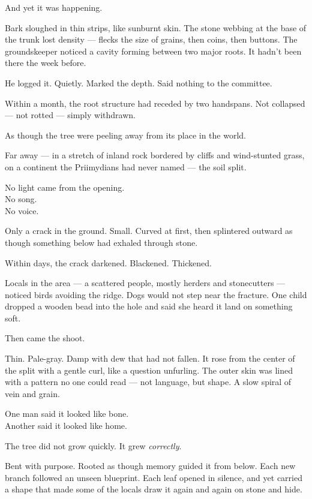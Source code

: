 \documentclass[9pt]{article}
\begin{document}
And yet it was happening.

Bark sloughed in thin strips, like sunburnt skin. The stone webbing at the base of the trunk lost density --- flecks the size of grains, then coins, then buttons. The groundskeeper noticed a cavity forming between two major roots. It hadn’t been there the week before.

He logged it. Quietly. Marked the depth. Said nothing to the committee.

Within a month, the root structure had receded by two handspans. Not collapsed --- not rotted --- simply withdrawn.

As though the tree were peeling away from its place in the world.

\vspace{1em}

Far away --- in a stretch of inland rock bordered by cliffs and wind-stunted grass, on a continent the Priimydians had never named --- the soil split.

No light came from the opening.\\
No song.\\
No voice.

Only a crack in the ground. Small. Curved at first, then splintered outward as though something below had exhaled through stone.

Within days, the crack darkened. Blackened. Thickened.

Locals in the area --- a scattered people, mostly herders and stonecutters --- noticed birds avoiding the ridge. Dogs would not step near the fracture. One child dropped a wooden bead into the hole and said she heard it land on something soft.

Then came the shoot.

Thin. Pale-gray. Damp with dew that had not fallen. It rose from the center of the split with a gentle curl, like a question unfurling. The outer skin was lined with a pattern no one could read --- not language, but shape. A slow spiral of vein and grain.

One man said it looked like bone.\\
Another said it looked like home.

\vspace{1em}

The tree did not grow quickly. It grew \textit{correctly}.

Bent with purpose. Rooted as though memory guided it from below. Each new branch followed an unseen blueprint. Each leaf opened in silence, and yet carried a shape that made some of the locals draw it again and again on stone and hide.
\end{document}

